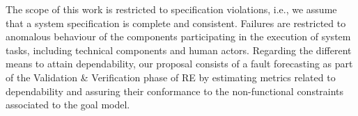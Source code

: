 
The scope of this work is restricted to specification violations, i.e., we assume that a system specification is complete and consistent. Failures are restricted to anomalous behaviour of the components participating in the execution of system tasks, including technical components and human actors. Regarding the different means to attain dependability, our proposal consists of a fault forecasting as part of the Validation \& Verification phase of RE by estimating metrics related to dependability and assuring their conformance to the non-functional constraints associated to the goal model. 

%
%
%
%
%
%
%
%
%
%
